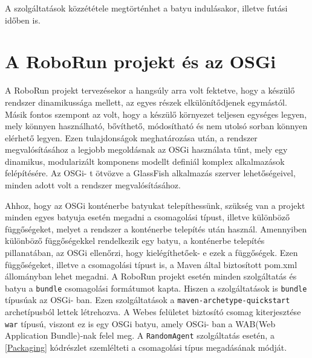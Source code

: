 %


A szolgáltatások közzététele megtörténhet a batyu indulásakor, illetve futási időben is.

\section{A RoboRun projekt és az OSGi}\label{sec:RoboRun és OSGi}

A RoboRun projekt tervezésekor a hangsúly arra volt fektetve, hogy a készülő rendszer dinamikussága mellett, az egyes részek elkülönítődjenek egymástól. Másik fontos szempont az volt, hogy a készülő környezet teljesen egységes legyen, mely könnyen használható, bővíthető, módosítható és nem utolsó sorban könnyen elérhető legyen. Ezen tulajdonságok meghatározása után, a rendszer megvalósításához a legjobb megoldásnak az OSGi használata tűnt, mely egy dinamikus, modularizált komponens modellt definiál komplex alkalmazások felépítésére. Az OSGi- t ötvözve a GlassFish alkalmazás szerver lehetőségeivel, minden adott volt a rendszer megvalósításához.

Ahhoz, hogy az OSGi konténerbe batyukat telepíthessünk, szükség van a projekt minden egyes batyuja esetén megadni a csomagolási típust, illetve különböző függőségeket, melyet a rendszer a konténerbe telepítés után használ. Amennyiben különböző függőségekkel rendelkezik egy batyu, a konténerbe telepítés pillanatában, az OSGi ellenőrzi, hogy kielégíthetőek- e ezek a függőségek. Ezen függőségeket, illetve a csomagolási típust is, a Maven által biztosított pom.xml állományban lehet megadni. A RoboRun projekt esetén minden szolgáltatás és batyu a \texttt{bundle} csomagolási formátumot kapta. Hiszen a szolgáltatások is \texttt{bundle} típusúak az OSGi- ban. Ezen szolgáltatások a \texttt{maven-archetype-quickstart} archetípusból lettek létrehozva. A Webes felületet biztosító csomag kiterjesztése \texttt{war} típusú, viszont ez is egy OSGi batyu, amely OSGi- ban a WAB(Web Application Bundle)-nak felel meg. A \texttt{RandomAgent} szolgáltatás esetén, a \ref{Packaging} kódrészlet szemlélteti a csomagolási típus megadásának módját.

%


